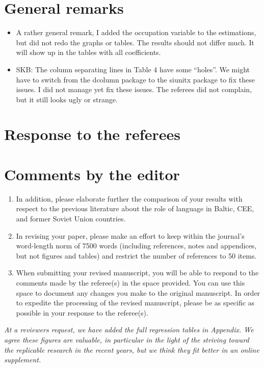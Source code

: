 \documentclass{article}
\newcommand{\debug}[1]{\marginpar{\small\raggedright\begin{spacing}{1}
      \color{BrickRed} #1
\end{spacing}
}}
\newenvironment{response}
{\slshape}{}
\begin{document}
	\section*{General remarks} %
\begin{itemize}
	\item A rather general remark, I added the occupation variable to the estimations, but did not redo the graphs or tables. The results should not differ much. It will show up in the tables with all coefficients.
\item SKB: The column separating lines in Table 4 have some \enquote{holes}. We might have to switch from the dcolumn package to the siunitx package to fix these issues. I did not manage yet fix these issues. The referees did not complain, but it still looks ugly or strange. 
\end{itemize}
\section*{Response to the referees}

\section{Comments by the editor}

\begin{enumerate}
\item In addition, please elaborate further the comparison of your
  results with respect to the previous literature about the role of
  language in Baltic, CEE, and former Soviet Union countries. 
\item 
In revising your paper, please make an effort to keep within the
journal's word-length norm of 7500 words (including references, notes
and appendices, but not figures and tables) and restrict the number of
references to 50 items.

\debug{nothing else but 7500 words/50 items.}
\item When submitting your revised manuscript, you will be able to respond to the comments made by the referee(s) in the space provided.  You can use this space to document any changes you make to the original manuscript.  In order to expedite the processing of the revised manuscript, please be as specific as possible in your response to the referee(s).
\end{enumerate}

\begin{response}
  At a reviewers request, we have added the full regression tables in
  Appendix.  We agree these figures are valuable, in particular in the
  light of the striving toward the replicable research in the recent
  years, but we think they fit better in an online supplement.
\end{response}
\end{document}
